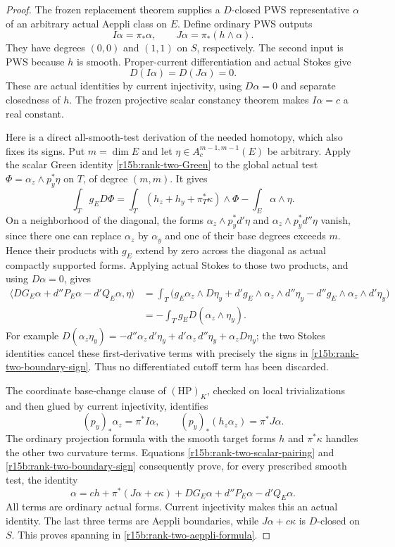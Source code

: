 \begin{proof}
The frozen replacement theorem supplies a $D$-closed PWS
representative $\alpha$ of an arbitrary actual Aeppli class
on $E$. Define ordinary PWS outputs
\[
                     I\alpha=\pi_*\alpha,\qquad
                     J\alpha=\pi_*(h\wedge\alpha).
\tag{PB15.7}\label{r15b:rank-two-IJ}
\]
They have degrees $(0,0)$ and $(1,1)$ on $S$, respectively.
The second input is PWS because $h$ is smooth. Proper-current
differentiation and actual Stokes give
\[
                             D(I\alpha)=D(J\alpha)=0.
\]
These are actual identities by current injectivity, using
$D\alpha=0$ and separate closedness of $h$. The frozen
projective scalar constancy theorem makes $I\alpha=c$ a
real constant.

Here is a direct all-smooth-test derivation of the needed
homotopy, which also fixes its signs. Put $m=\dim E$ and let
$\eta\in A_c^{m-1,m-1}(E)$ be arbitrary. Apply the scalar
Green identity \eqref{r15b:rank-two-Green} to the global actual
test $\Phi=\alpha_z\wedge p_y^*\eta$ on $T$, of degree
$(m,m)$. It gives
\[
 \int_Tg_E D\Phi
   =\int_T(h_z+h_y+\pi_T^*\kappa)\wedge\Phi
                                     -\int_E\alpha\wedge\eta.
\tag{PB15.8}\label{r15b:rank-two-scalar-pairing}
\]
On a neighborhood of the diagonal, the forms
$\alpha_z\wedge p_y^*d'\eta$ and
$\alpha_z\wedge p_y^*d''\eta$ vanish, since there one can
replace $\alpha_z$ by $\alpha_y$ and one of their base degrees
exceeds $m$. Hence their products with $g_E$ extend by zero
across the diagonal as actual compactly supported forms.
Applying actual Stokes to those two products, and using
$D\alpha=0$, gives
\[
 \begin{split}
 \big\langle DG_E\alpha+d''P_E\alpha-d'Q_E\alpha,\eta\big\rangle
 &=\int_T\bigl(g_E\alpha_z\wedge D\eta_y
      +d'g_E\wedge\alpha_z\wedge d''\eta_y
      -d''g_E\wedge\alpha_z\wedge d'\eta_y\bigr)\\
 &=-\int_Tg_E D(\alpha_z\wedge\eta_y).
 \end{split}
\tag{PB15.9}\label{r15b:rank-two-boundary-sign}
\]
For example
$D(\alpha_z\eta_y)=-d''\alpha_z\,d'\eta_y
 +d'\alpha_z\,d''\eta_y+\alpha_zD\eta_y$;
the two Stokes identities cancel these first-derivative terms
with precisely the signs in \eqref{r15b:rank-two-boundary-sign}.
Thus no differentiated cutoff term has been discarded.

The coordinate base-change clause of $(\mathrm{HP})_K$,
checked on local trivializations and then glued by current
injectivity, identifies
\[
 (p_y)_*\alpha_z=\pi^*I\alpha,
 \qquad (p_y)_*(h_z\alpha_z)=\pi^*J\alpha.
\]
The ordinary projection formula with the smooth target forms
$h$ and $\pi^*\kappa$ handles the other two curvature terms.
Equations \eqref{r15b:rank-two-scalar-pairing} and
\eqref{r15b:rank-two-boundary-sign} consequently prove, for
every prescribed smooth test, the identity
\[
 \alpha=c h+\pi^*(J\alpha+c\kappa)
                  +DG_E\alpha+d''P_E\alpha-d'Q_E\alpha.
\tag{PB15.10}\label{r15b:rank-two-homotopy}
\]
All terms are ordinary actual forms. Current injectivity makes
this an actual identity. The last three terms are Aeppli
boundaries, while $J\alpha+c\kappa$ is $D$-closed on $S$.
This proves spanning in \eqref{r15b:rank-two-aeppli-formula}.


\end{proof}
